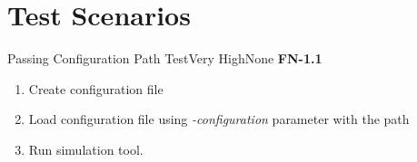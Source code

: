 \chapter{Test Scenarios} \label{chp:test-scenarios}
	\begin{testcase}{Passing Configuration Path Test}{Very High}{None}
		{
			\textbf{FN-1.1}
		}
		{
			\begin{enumerate}
				\item Create configuration file
				\item Load configuration file using \emph{-configuration} parameter with the path
				\item Run simulation tool.
			\end{enumerate}
		}
	\end{testcase}
	
